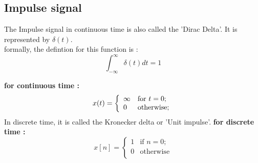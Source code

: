 \documentclass[a4paper,12pt]{book}
\begin{document}
\subsection*{Impulse signal}
The Impulse signal in continuous time is also called the 'Dirac Delta'. It is represented by $\delta(t)$.\\
formally, the defintion for this function is : $$\int_{-\infty}^{\infty}\delta (t)dt = 1$$

{\bf for continuous time :}\\
	\[ x(t) = \left\{ \begin{array}{ll}

	$$\infty$$ & \mbox{for $t = 0$;} \\

	0 & \mbox{otherwise;} \\

	\end{array}
	\right. \]
\bigskip
In discrete time, it is called the Kronecker delta or 'Unit impulse'.
{\bf for discrete time :}\\
	\[ x[n] = \left\{ \begin{array}{ll}

	1 & \mbox{if $n = 0$;} \\

	0 & \mbox{otherwise} \\

	\end{array}
	\right. \]
\end{document}
